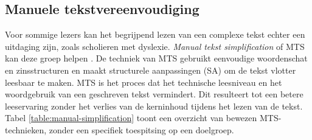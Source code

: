 \subsection{Manuele tekstvereenvoudiging}

Voor sommige lezers kan het begrijpend lezen van een complexe tekst echter een uitdaging zijn, zoals scholieren met dyslexie. \textit{Manual tekst simplification} of MTS kan deze groep helpen \autocite{Siddharthan2014}. De techniek van MTS gebruikt eenvoudige woordenschat en zinsstructuren en maakt structurele aanpassingen (SA) om de tekst vlotter leesbaar te maken. MTS is het proces dat het technische leesniveau en het woordgebruik van een geschreven tekst vermindert. Dit resulteert tot een betere leeservaring zonder het verlies van de kerninhoud tijdens het lezen van de tekst. Tabel \ref{table:manual-simplification} toont een overzicht van bewezen MTS-technieken, zonder een specifiek toespitsing op een doelgroep.

